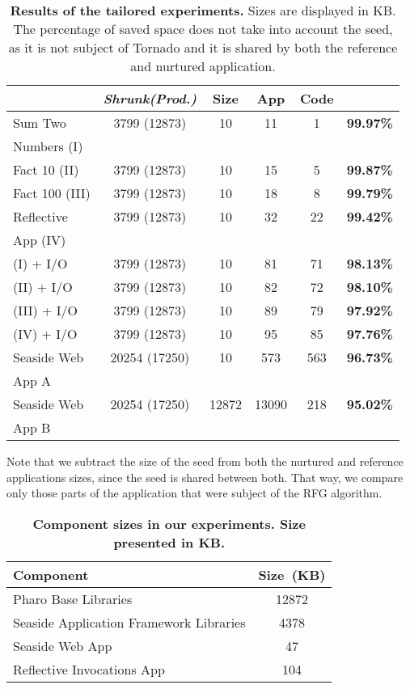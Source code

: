 \begin{description}
\begin{table}[ht]
\begin{tabular}{|l|cccc>{\columncolor[gray]{0.8}}c|}
 			& \textbf{\emph{Shrunk(Prod.)}}
			& \textbf{Size}
			& \textbf{App}
			& \textbf{Code}
			& \textbf{}\\
		\hline
		Sum Two
 			&  3799 (12873) & 10 & 11 & 1 & \textbf{99.97\%}\\
		Numbers (I)
 			& &&&&\\
		\hline
		Fact 10 (II)
 			& 3799 (12873) & 10 & 15 & 5 & \textbf{99.87\%}\\
		\hline
		Fact 100 (III)
 			& 3799 (12873) & 10 & 18 & 8 & \textbf{99.79\%}\\
		\hline
		Reflective
 			& 3799 (12873) & 10 & 32 & 22 & \textbf{99.42\%}\\
		App (IV)&&&&&\\
		\hline
		(I) + I/O
 			& 3799 (12873) & 10 & 81 & 71 & \textbf{98.13\%}\\
		\hline
		(II) + I/O
 			& 3799 (12873) & 10 & 82 & 72 & \textbf{98.10\%}\\
		\hline
		(III) + I/O
 			& 3799 (12873) & 10 & 89 & 79 & \textbf{97.92\%}\\
		\hline
		(IV) + I/O
 			& 3799 (12873) & 10 & 95 & 85 & \textbf{97.76\%}\\
		\hline
		Seaside Web
 			& 20254 (17250) & 10 & 573 & 563 & \textbf{96.73\%}\\
		App A&&&&&\\
		\hline
		Seaside Web
 			& 20254 (17250) & 12872 & 13090 & 218 & \textbf{95.02\%}\\
		App B&&&&&\\
		\hline
 	\end{tabular}
 	\caption{\small\textbf{Results of the tailored experiments.} Sizes are displayed in KB. The percentage of saved space does not take into account the seed, as it is not subject of Tornado and it is shared by both the reference and nurtured application.}
 	\label{tb:results}
 \end{table}


Note that we subtract the size of the seed from both the nurtured and reference applications sizes, since the seed is shared between both. That way, we compare only those parts of the application that were subject of the RFG algorithm.

\end{description}

 \begin{table}[ht]
 \small
 	\centering
 	\begin{tabular}{|lc|}
			\hline
			\textbf{Component}
 			& \textbf{Size~(KB)}\\
		\hline
		Pharo Base Libraries & 12872\\\hline
		Seaside Application Framework Libraries & 4378\\\hline
		Seaside Web App & 47\\\hline
		Reflective Invocations App & 104\\\hline
 	\end{tabular}
 	\caption{\small\textbf{Component sizes in our experiments. Size presented in KB.} \label{tb:tailored_components}}
 	\label{tb:basic_sizes}
 \end{table}

